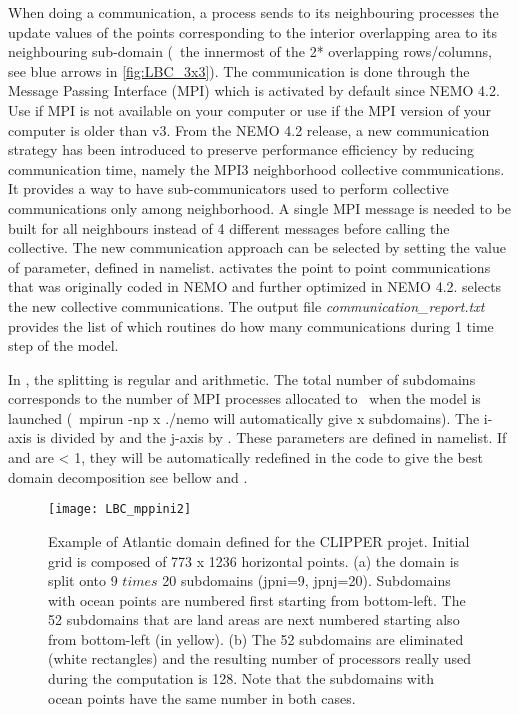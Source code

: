 \documentclass[../main/NEMO_manual]{subfiles}
\begin{document}
When doing a communication, a process sends to its neighbouring processes the update values of the points corresponding to
the interior overlapping area to its neighbouring sub-domain (\ie\ the  innermost of the 2* overlapping rows/columns, see blue arrows in \autoref{fig:LBC_3x3}).
The communication is done through the Message Passing Interface (MPI) which is activated by default since NEMO 4.2.
Use  if MPI is not available on your computer or use  if the MPI version of your computer is older than v3.
From the NEMO 4.2 release, a new communication strategy has been introduced to preserve performance efficiency
by reducing communication time, namely the MPI3 neighborhood collective communications.
It provides a way to have sub-communicators used to perform collective communications only among neighborhood.
A single MPI message is needed to be built for all neighbours instead of 4 different messages before calling the collective.
The new communication approach can be selected by setting the value of  parameter, defined in  namelist.  activates the point to point communications that was originally coded in NEMO and further optimized in NEMO 4.2.  selects the new collective communications.
The output file \textit{communication\_report.txt} provides the list of which routines do how
many communications during 1 time step of the model.

In \NEMO, the splitting is regular and arithmetic.
The total number of subdomains corresponds to the number of MPI processes allocated to \NEMO\ when the model is launched
(\ie\ mpirun -np x ./nemo will automatically give x subdomains).
The i-axis is divided by  and the j-axis by .
These parameters are defined in  namelist.
If  and  are < 1, they will be automatically redefined in the code to give the best domain decomposition see bellow and \citep{Irrmann2022}. 

\begin{figure}[h]
  \centering
  \texttt{[image: LBC\_mppini2]}
  \caption[Atlantic domain defined for the CLIPPER projet]{
    Example of Atlantic domain defined for the CLIPPER projet.
    Initial grid is composed of 773 x 1236 horizontal points.
    (a) the domain is split onto 9 $times$ 20 subdomains (jpni=9, jpnj=20). Subdomains with ocean points are numbered first starting from bottom-left. The 52 subdomains that are land areas are next numbered starting also from bottom-left (in yellow).
    (b) The 52 subdomains are eliminated (white rectangles) and
    the resulting number of processors really used during the computation is 128. Note that the subdomains with ocean points have the same number in both cases.}
  \label{fig:LBC_mppini2}
\end{figure}
\end{document}
